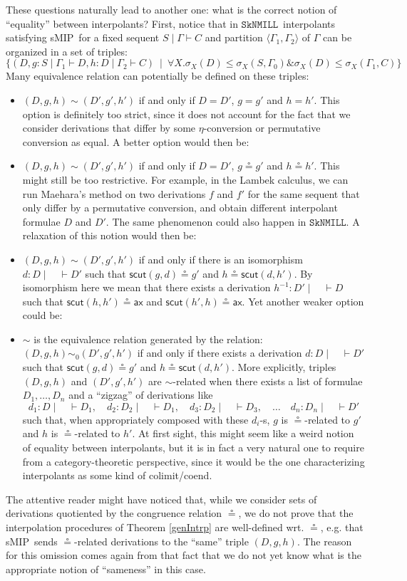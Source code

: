 \documentclass[sn-mathphys-num]{sn-jnl}%
\newcommand{\GG}{\Gamma}
\newcommand{\vd}{\vdash}
\newcommand{\ax}{\mathsf{ax}}
\newcommand{\SkNMILL}{$\mathtt{SkNMILL}$}
\newcommand{\mf}[1]{\mathsf{#1}}
\newcommand{\gs}[1]{\sigma_{X} (#1)}
\newcommand{\scut}[2]{\mf{scut} (#1 , #2)}
\newcommand{\sMIP}{\textsf{sMIP}}
\theoremstyle{thmstyleone}%
\theoremstyle{thmstyletwo}%
\theoremstyle{thmstylethree}%
\begin{document}
These questions naturally lead to another one: what is the correct notion of ``equality'' between interpolants?
First, notice that in \SkNMILL~interpolants satisfying \sMIP~for a fixed sequent $S \mid \GG \vd C$ and partition $\langle \GG_1,\GG_2 \rangle$ of $\GG$ can be organized in a set of triples:
\[
\{
(D, g : S \mid \GG_1 \vd D, h: D \mid \GG_2 \vd C) \ \mid \
\forall X. \gs{D} \leq \gs{S , \GG_0} \& \gs{D} \leq \gs{\GG_1 , C}
\}
\]
Many equivalence relation can potentially be defined on these triples:
\begin{itemize}
\item $(D,g,h) \sim (D',g',h')$ if and only if $D = D'$, $g = g'$ and $h = h'$. This option is definitely too strict, since it does not account for the fact that we consider derivations that differ by some $\eta$-conversion or permutative conversion as equal. A better option would then be:
\item $(D,g,h) \sim (D',g',h')$ if and only if $D = D'$, $g \circeq g'$ and $h \circeq h'$. This might still be too restrictive. For example, in the Lambek calculus, we can run Maehara's method on two derivations $f$ and $f'$ for the same sequent that only differ by a permutative conversion, and obtain different interpolant formulae $D$ and $D'$. The same phenomenon could also happen in \SkNMILL. A relaxation of this notion would then be:
\item $(D,g,h) \sim (D',g',h')$ if and only if there is an isomorphism $d : D \mid \quad \vd D'$ such that $\mf{scut} (g,d) \circeq g'$ and $h \circeq \mf{scut} (d,h')$. By isomorphism here we mean that there exists a derivation $h^{-1} : D' \mid \quad \vd D$ such that $\scut{h}{h'} \circeq \ax$ and $\scut{h'}{h} \circeq \ax$. Yet another weaker option could be:
\item $\sim$ is the equivalence relation generated by the relation:
  $(D,g,h) \sim_0 (D',g',h')$ if and only if there exists a derivation $d : D \mid \quad \vd D'$ such that $\mf{scut} (g,d) \circeq g'$ and $h \circeq \mf{scut} (d,h')$. More explicitly, triples $(D,g,h)$ and $(D',g',h')$ are $\sim$-related when there exists a
list of formulae $D_1,\dots,D_n$ and a ``zigzag'' of derivations like
  \[
  d_1 : D \mid \quad \vd D_1,
  \quad
  d_2 : D_2 \mid \quad \vd D_1,
  \quad
  d_3 : D_2 \mid \quad \vd D_3,
  \quad
  \dots
  \quad
  d_n : D_n \mid \quad \vd D'
  \]
  such that, when appropriately composed with these $d_i$-s, $g$ is $\circeq$-related to $g'$ and $h$ is $\circeq$-related to $h'$.
  At first sight, this might seem like a weird notion of equality between interpolants, but it is in fact a very natural one to require from a category-theoretic perspective,  since it would be the one characterizing interpolants as some kind of colimit/coend.
\end{itemize}
The attentive reader might have noticed that, while we consider sets of derivations quotiented by the congruence relation $\circeq$, we do not prove that the interpolation procedures of Theorem \ref{genIntrp} are well-defined wrt. $\circeq$, e.g. that \sMIP~sends $\circeq$-related derivations to the ``same'' triple $(D,g,h)$.
The reason for this omission comes again from that fact that we do not yet know what is the appropriate notion of ``sameness'' in this case.
\end{document}
